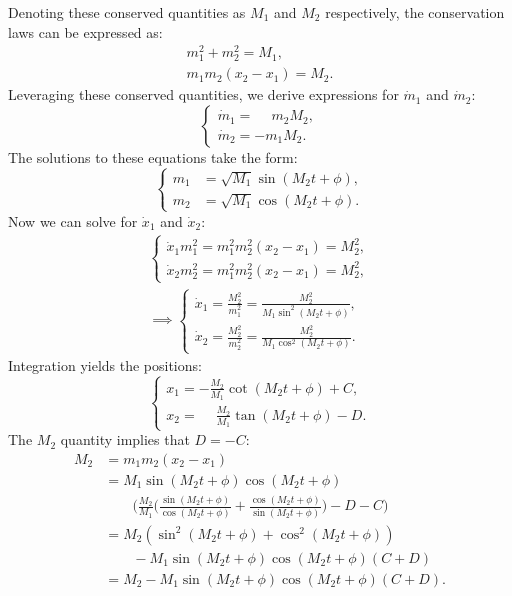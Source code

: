 \documentclass[english,master]{liumaiex}
\theoremstyle{plain}
\theoremstyle{definition}
\begin{document}
%
Denoting these conserved quantities as $M_1$ and $M_2$ respectively, the conservation laws can be expressed as:
\begin{align}
	m_1^2 + m_2^2 = M_1, \\
	m_1m_2(x_2 - x_1) = M_2.
\end{align}
%
Leveraging these conserved quantities, we derive expressions for $\dot{m}_1$ and $\dot{m}_2$:
\begin{equation}
\left\{ \begin{aligned}
	\dot{m}_1 = \phantom{-}m_2M_2, \\
	\dot{m}_2 = -m_1M_2.
\end{aligned} \right.
\end{equation}
%
The solutions to these equations take the form:
\begin{equation}
\left\{ \begin{aligned}
	m_1 &= \sqrt{M_1} \sin(M_2t + \phi), \\
	m_2 &= \sqrt{M_1} \cos(M_2t + \phi).
\end{aligned} \right.
\end{equation}
%
Now we can solve for $\dot{x}_1$ and $\dot{x}_2$:
\begin{align}
\left\{ \begin{aligned}
	\dot{x}_1m_1^2 = m_1^2m_2^2(x_2 - x_1) = M_2^2, \\
	\dot{x}_2m_2^2 = m_1^2m_2^2(x_2 - x_1) = M_2^2,
\end{aligned} \right. \\
\implies \left\{ \begin{aligned}
	\dot{x}_1 = \frac{M_2^2}{m_1^2} = \frac{M_2^2}{M_1\sin^2(M_2t + \phi)}, \\
	\dot{x}_2 = \frac{M_2^2}{m_2^2} = \frac{M_2^2}{M_1\cos^2(M_2t + \phi)}.
\end{aligned} \right.
\end{align}
%
Integration yields the positions:
\begin{equation}
\left\{ \begin{aligned}
	x_1 = -\frac{M_2}{M_1}\cot(M_2t + \phi) + C,\\
	x_2 = \phantom{-}\frac{M_2}{M_1}\tan(M_2t + \phi) - D.
\end{aligned} \right.
\end{equation}
%
The $M_2$ quantity implies that $D = -C$:
\begin{equation}
\begin{aligned}
	M_2 &= m_1m_2(x_2 - x_1) \\
	&= M_1 \sin(M_2t + \phi) \cos(M_2t + \phi) \\
	& \qquad \Big( \frac{M_2}{M_1} \Big(\frac{\sin(M_2t + \phi)}{\cos(M_2t + \phi)} +
	\frac{\cos(M_2t + \phi)}{\sin(M_2t + \phi)}\Big) - D - C \Big) \\
	&= M_2(\sin^2(M_2t + \phi) + \cos^2(M_2t + \phi)) \\
	& \qquad - M_1 \sin(M_2t + \phi) \cos(M_2t + \phi)(C + D) \\
	&= M_2 - M_1 \sin(M_2t + \phi) \cos(M_2t + \phi)(C + D).
\end{aligned}
\end{equation}
\end{document}
